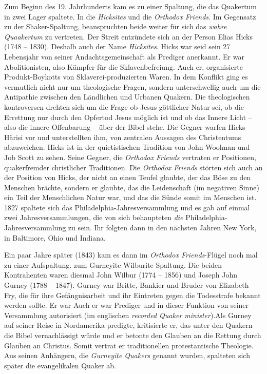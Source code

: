 Zum Beginn des 19. Jahrhunderts kam es zu einer Spaltung, die das Quakertum in
zwei Lager spaltete. In die \textit{Hicksites} und die \textit{Orthodox
Friends}. Im Gegensatz zu der Shaker-Spaltung, beanspruchten beide weiter für
sich das \textit{wahre Quaakertum} zu vertreten. Der Streit entzündete sich an
der Person Elias Hicks (1748 -- 1830). Deshalb auch der Name \textit{Hicksites}.
Hicks war seid sein 27 Lebensjahr von seiner Andachtsgemeinschaft als Prediger
anerkannt. Er war Abolitionisten, also Kämpfer für die Sklavenbefreiung. Auch
er, organisierte Produkt-Boykotts von Sklaverei-produzierten Waren. In dem
Konflikt ging es vermutlich nicht nur um theologische Fragen, sondern
unterschwellig auch um die Antipathie zwischen den Ländlichen und Urbanen
Quakern. Die theologischen kontroversen drehten sich um die Frage ob Jesus
göttlicher Natur sei, ob die Errettung nur durch den Opfertod Jesus möglich ist
und ob das Innere Licht -- also die innere Offenbarung -- über der Bibel stehe.
Die Gegner warfen Hicks Härisi vor und unterstellten ihm, von zentralen
Aussagen des Christentums abzuweichen. Hicks ist in der quietistischen Tradition
von John Woolman und Job Scott zu sehen. Seine Gegner, die \textit{Orthodox
Friends} vertraten er Positionen, quakerfremder christlicher Traditionen. Die
\textit{Orthodox Friends} störten sich auch an der Position von Hicks, der nicht
an einen Teufel glaubte, der das Böse zu den Menschen brächte, sondern er
glaubte, das die Leidenschaft (im negativen Sinne) ein Teil der Menschlichen
Natur war, und das die Sünde somit im Menschen ist. 1827 spaltete sich das
Philadelphia-Jahresversammlung und es gab auf einmal zwei Jahresversammlungen,
die von sich behaupteten \textit{die} Philadelphia-Jahresversammlung zu sein.
Ihr folgten dann in den nächsten Jahren New York, in Baltimore, Ohio und
Indiana.

\medskip

Ein paar Jahre später (1843) kam es dann im \textit{Orthodox Friends}-Flügel
noch mal zu einer Aufspaltung. zum Gurneyite-Wilburite-Spaltung. Die beiden
Kontrahenten waren diesmal John Wilbur (1774 -- 1856) und Joseph John Gurney
(1788 -- 1847). Gurney war Britte, Bankier und Bruder von Elizabeth Fry, die für
ihre Gefängnisarbeit und ihr Eintreten gegen die Todesstrafe bekannt werden
sollte. Er war Auch er war Prediger und in dieser Funktion von seiner
Versammlung autorisiert (im englischen \textit{recorded Quaker minister}).Als
Gurney auf seiner Reise in Nordamerika predigte, kritisierte er, das unter den
Quakern die Bibel vernachlässigt würde und er betonte den Glauben an die
Rettung durch Glauben an Christus. Somit vertrat er traditionellen
protestantische Theologie. Aus seinen Anhängern, die \textit{Gurneyite Quakers}
genannt wurden, spalteten sich später die evangelikalen Quaker ab.

